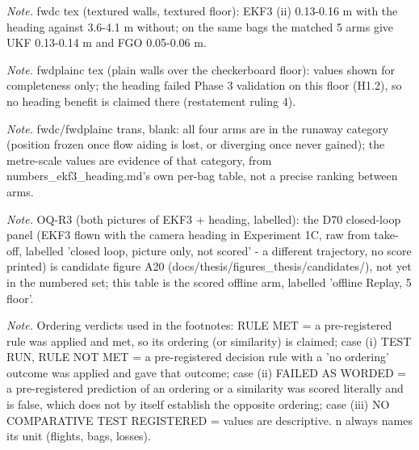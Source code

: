 \begin{table}[htbp]
\textit{Note.} fwdc tex (textured walls, textured floor): EKF3 (ii) 0.13-0.16 m with the heading against 3.6-4.1 m without; on the same bags the matched 5\textdegree{} arms give UKF 0.13-0.14 m and FGO 0.05-0.06 m.\par
\textit{Note.} fwdplainc tex (plain walls over the checkerboard floor): values shown for completeness only; the heading failed Phase 3 validation on this floor (H1.2), so no heading benefit is claimed there (restatement ruling 4).\par
\textit{Note.} fwdc/fwdplainc trans, blank: all four arms are in the runaway category (position frozen once flow aiding is lost, or diverging once never gained); the metre-scale values are evidence of that category, from numbers\_ekf3\_heading.md's own per-bag table, not a precise ranking between arms.\par
\textit{Note.} OQ-R3 (both pictures of EKF3 + heading, labelled): the D70 closed-loop panel (EKF3 flown with the camera heading in Experiment 1C, raw from take-off, labelled 'closed loop, picture only, not scored' - a different trajectory, no score printed) is candidate figure A20 (docs/thesis/figures\_thesis/candidates/), not yet in the numbered set; this table is the scored offline arm, labelled 'offline Replay, 5\textdegree{} floor'.\par
\textit{Note.} Ordering verdicts used in the footnotes: RULE MET = a pre-registered rule was applied and met, so its ordering (or similarity) is claimed; case (i) TEST RUN, RULE NOT MET = a pre-registered decision rule with a 'no ordering' outcome was applied and gave that outcome; case (ii) FAILED AS WORDED = a pre-registered prediction of an ordering or a similarity was scored literally and is false, which does not by itself establish the opposite ordering; case (iii) NO COMPARATIVE TEST REGISTERED = values are descriptive. n always names its unit (flights, bags, losses).\par
\end{table}
